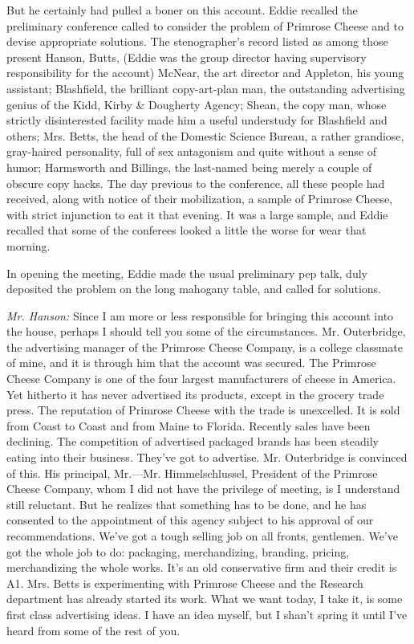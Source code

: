 \documentclass[openany,nobib]{tufte-book}
\begin{document}
But he certainly had pulled a boner on this account. Eddie recalled the
preliminary conference called to consider the problem of Primrose Cheese
and to devise appropriate solutions.
\enlargethispage{\baselineskip}
The stenographer's record listed as among those present Hanson, Butts,
(Eddie was the group director having supervisory responsibility for the
account) McNear, the art director and Appleton, his young assistant;
Blashfield, the brilliant copy-art-plan man, the outstanding advertising
genius of the Kidd, Kirby \& Dougherty Agency; Shean, the copy man,
whose strictly disinterested facility made him a useful understudy for
Blashfield and others; Mrs. Betts, the head of the Domestic Science
Bureau, a rather grandiose, gray-haired personality, full of sex
antagonism and quite without a sense of humor; 
Harmsworth and Billings,
the last-named being merely a couple of obscure copy hacks.
\clearpage
The day previous to the conference, all these people had received, along
with notice of their mobilization, a sample of Primrose Cheese, with
strict injunction to eat it that evening. It was a large sample, and
Eddie recalled that some of the conferees looked a little the worse for
wear that morning.

In opening the meeting, Eddie made the usual preliminary pep talk, duly
deposited the problem on the long mahogany table, and called for
solutions.

\emph{Mr. Hanson:} Since I am more or less responsible for bringing this
account into the house, perhaps I should tell you some of the
circumstances. Mr. Outerbridge, the advertising manager of the Primrose
Cheese Company, is a college classmate of mine, and it is through him
that the account was secured. The Primrose Cheese Company is one of the
four largest manufacturers of cheese in America. Yet hitherto it has
never advertised its products, except in the grocery trade press. The
reputation of Primrose Cheese with the trade is unexcelled. It is sold
from Coast to Coast and from Maine to Florida. Recently sales have been
declining. The competition of advertised packaged brands has been
steadily eating into their business. They've got to advertise. Mr.
Outerbridge is convinced of this. His principal, Mr.---Mr.
Himmelschlussel, President of the Primrose Cheese Company, whom I did
not have the privilege of meeting, is I understand still reluctant. But
he realizes that something has to be done, and he has consented to the
appointment of this agency subject to his approval of our
recommendations. We've got a tough selling job on all fronts, gentlemen.
We've got the whole job to do: packaging, merchandizing, branding,
pricing, merchandizing the whole works. It's an old conservative firm
and their credit is A1. Mrs. Betts is experimenting with Primrose Cheese
and the Research department has already started its work. What we want
today, I take it, is some first class advertising ideas. I have an idea
myself, but I shan't spring it until I've heard from some of the rest of
you.
\end{document}
